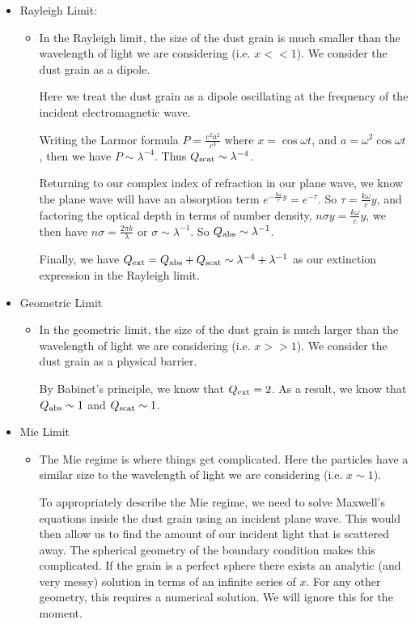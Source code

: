 \documentclass{article}
\begin{document}
\begin{itemize}
    \item Rayleigh Limit:
    \begin{itemize}
        \item In the Rayleigh limit, the size of the dust grain is much smaller than the wavelength of light we are considering (i.e. $x << 1$). We consider the dust grain as a dipole.

        Here we treat the dust grain as a dipole oscillating at the frequency of the incident electromagnetic wave. 

        Writing the Larmor formula $P = \frac{e^{2} a^{2}}{c^{3}}$ where $x = \cos{\omega t}$, and $a = \omega^{2} \cos{\omega t}$, then we have $P \sim \lambda^{-4}$. Thus $Q_{\rm{scat}} \sim \lambda^{-4}$.

        Returning to our complex index of refraction in our plane wave, we know the plane wave will have an absorption term $e^{-\frac{k \omega}{c} y} = e^{-\tau}$. So $\tau = \frac{k \omega}{c}y$, and factoring the optical depth in terms of number density, $n \sigma y = \frac{k \omega}{c}y$, we then have $n \sigma = \frac{2 \pi k}{\lambda}$ or $\sigma \sim \lambda^{-1}$. So  $Q_{\rm{abs}} \sim \lambda^{-1}$.

        Finally, we have $Q_{\rm{ext}} = Q_{\rm{abs}} + Q_{\rm{scat}} \sim \lambda^{-4} + \lambda^{-1}$ as our extinction expression in the Rayleigh limit. 
    \end{itemize}
    \item Geometric Limit
    \begin{itemize}
        \item In the geometric limit, the size of the dust grain is much larger than the wavelength of light we are considering (i.e. $x >> 1$). We consider the dust grain as a physical barrier.

        By Babinet's principle, we know that $Q_{\rm{ext}} = 2$. As a result, we know that $Q_{\rm{abs}} \sim 1$ and $Q_{\rm{scat}} \sim 1$.
    \end{itemize}   
    \item Mie Limit
    \begin{itemize}
        \item The Mie regime is where things get complicated. Here the particles have a similar size to the wavelength of light we are considering (i.e. $x \sim 1$). 

        To appropriately describe the Mie regime, we need to solve Maxwell's equations inside the dust grain using an incident plane wave. This would then allow us to find the amount of our incident light that is scattered away. The spherical geometry of the boundary condition makes this complicated. If the grain is a perfect sphere there exists an analytic (and very messy) solution in terms of an infinite series of $x$. For any other geometry, this requires a numerical solution. We will ignore this for the moment.


\end{itemize}
\end{itemize}
\end{document}
